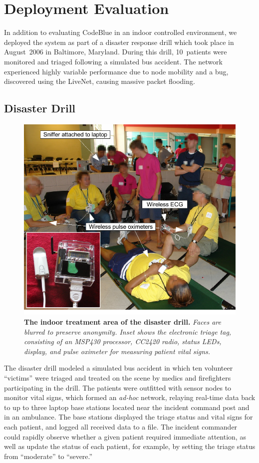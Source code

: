 \section{Deployment Evaluation}
\label{sec-livenet-deployment-eval}
\label{sec-livenet-deployment}

In addition to evaluating CodeBlue in an indoor controlled environment, we
deployed the system as part of a disaster response drill which took place in
August~2006 in Baltimore, Maryland. During this drill, 10~patients 
were monitored and triaged 
following a simulated bus accident. The network experienced highly variable
performance due to node mobility and a bug, discovered using the LiveNet,
causing massive packet flooding.


\subsection{Disaster Drill}
\label{sec-livenet-drill}

\begin{figure}[t]
\begin{center}
\includegraphics[width=0.6\hsize]{./resources/livenet-sensys07/figs/drill/drill2.pdf}
\end{center}
\caption{\small {\bf The indoor treatment area of the disaster
drill.} {\em Faces are blurred to preserve anonymity. 
Inset shows the electronic triage tag, consisting of an
MSP430 processor, CC2420 radio, status LEDs, display, and 
pulse oximeter for measuring patient vital signs.}}
\label{fig-drill}
\end{figure}

The disaster drill modeled a simulated bus accident in which ten
volunteer ``victims'' were triaged and treated on the scene by 
medics and firefighters participating in the
drill. The patients were outfitted with sensor nodes to
monitor vital signs, which formed an {\em ad-hoc} network, relaying
real-time data back to up to three laptop base stations located near the
incident command post and in an ambulance. The base stations displayed the triage status and vital
signs for each patient, and logged all received data to a file. The
incident commander could rapidly observe whether a given patient required 
immediate attention, as well as update the status of each patient, for
example, by setting the triage status from ``moderate'' to ``severe.''

